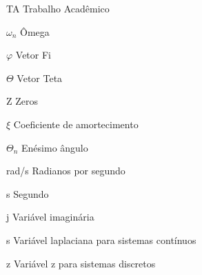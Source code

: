 \listoffigures*
\cleardoublepage

\listoftables*
\cleardoublepage

\begin{siglas}												%
    \item[TA]               Trabalho Acadêmico
	\item[$\omega _n $]     Ômega
	\item[$\varphi $]       Vetor Fi
	\item[$\Theta $]        Vetor Teta
	\item[Z]                Zeros
\end{siglas}

\begin{simbolos}											%
	\item[$\xi $]           Coeficiente de amortecimento
    \item[$\Theta  _n $]    Enésimo ângulo
	\item[rad/s]            Radianos por segundo
	\item[s]                Segundo
    \item[j]                Variável imaginária
    \item[s]	            Variável laplaciana para sistemas contínuos
    \item[z]                Variável z para sistemas discretos
\end{simbolos}

\tableofcontents*
\cleardoublepage